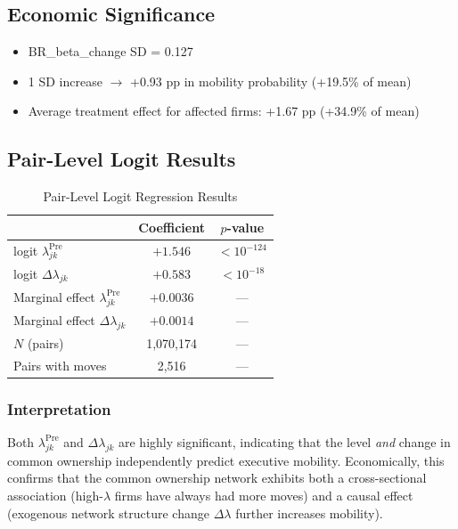 \documentclass[11pt,a4paper]{article}
\begin{document}
\subsection{Economic Significance}

\begin{itemize}
  \item BR\_beta\_change SD = 0.127
  \item 1 SD increase \(\rightarrow\) +0.93 pp in mobility probability (+19.5\% of mean)
  \item Average treatment effect for affected firms: +1.67 pp (+34.9\% of mean)
\end{itemize}

\subsection{Pair-Level Logit Results}

\begin{table}[h!]
\centering
\begin{tabular}{lcc}
\toprule
 & \textbf{Coefficient} & \textbf{\(p\)-value} \\
\midrule
logit \(\lambda_{jk}^{\text{Pre}}\) & \(+1.546\) & \(< 10^{-124}\) \\
logit \(\Delta\lambda_{jk}\) & \(+0.583\) & \(< 10^{-18}\) \\
\midrule
Marginal effect \(\lambda_{jk}^{\text{Pre}}\) & \(+0.0036\) & — \\
Marginal effect \(\Delta\lambda_{jk}\) & \(+0.0014\) & — \\
\midrule
\(N\) (pairs) & 1,070,174 & — \\
Pairs with moves & 2,516 & — \\
\bottomrule
\end{tabular}
\caption{Pair-Level Logit Regression Results}
\end{table}

\subsubsection*{Interpretation}

Both \(\lambda_{jk}^{\text{Pre}}\) and \(\Delta\lambda_{jk}\) are highly significant, indicating that the level {\em and} change in common ownership independently predict executive mobility. Economically, this confirms that the common ownership network exhibits both a cross-sectional association (high-\(\lambda\) firms have always had more moves) and a causal effect (exogenous network structure change \(\Delta\lambda\) further increases mobility).
\end{document}
